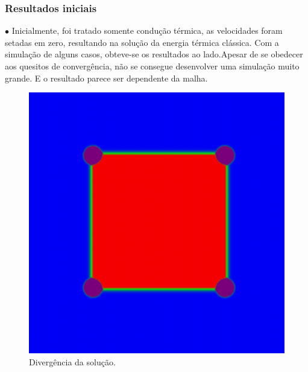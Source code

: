 \documentclass[xcolor=dvipsnames,10pt,aspectratio=169]{beamer}
\begin{document}
	
	\begin{frame}
	\frametitle{Resultados iniciais}
	\begin{minipage}[h!]{0.49\textwidth}
	$\bullet$  Inicialmente, foi tratado somente condução térmica, as velocidades foram setadas em zero, resultando na solução da energia térmica clássica. Com a simulação de alguns casos, obteve-se os resultados ao lado.Apesar de se obedecer aos quesitos de convergência, não se consegue desenvolver uma simulação muito grande. E o resultado parece ser dependente da malha.
	\end{minipage}
	\begin{minipage}[h!]{0.49\textwidth}
		\begin{figure}[h!]
			\centering
			\includegraphics[trim = {1cm 1cm 1cm 1cm}, clip , angle=0, scale=0.45]{preliminar_results_1}
			\caption{Divergência da solução.}
		\end{figure}
	\end{minipage}
	\end{frame}
\end{document}
